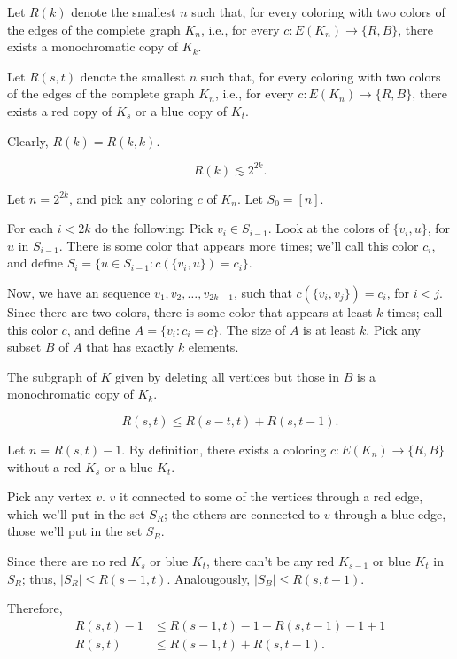 \begin{defn}
	Let $R(k)$ denote the smallest $n$ such that, for every coloring with two colors of the edges of the complete graph $K_n$, i.e., for every $c: E(K_n) \to \{R, B\}$, there exists a monochromatic copy of $K_k$.

	Let $R(s, t)$ denote the smallest $n$ such that, for every coloring with two colors of the edges of the complete graph $K_n$, i.e., for every $c: E(K_n) \to \{R, B\}$, there exists a red copy of $K_s$ or a blue copy of $K_t$.

	Clearly, $R(k) = R(k, k)$.
\end{defn}

\begin{thm}
	\[
		R(k) \lesssim 2^{2k}.
	\]
\end{thm}

\begin{sk}	
	Let $n = 2^{2k}$, and pick any coloring $c$ of $K_{n}$.
	Let $S_0 = [n]$.

	For each $i < 2k$ do the following:
	Pick $v_i \in S_{i-1}$. Look at the colors of $\{v_i, u\}$, for $u$ in $S_{i-1}$. There is some color that appears more times; we'll call this color $c_i$, and define $S_i = \{u \in S_{i-1} \colon c(\{v_i, u\}) = c_i\}$.


	Now, we have an sequence $v_1, v_2, \dots, v_{2k-1}$, such that $c(\{v_i, v_j\}) = c_i$, for $i < j$. Since there are two colors, there is some color that appears at least $k$ times; call this color $c$, and define $A = \{v_i \colon c_i = c\}$. The size of $A$ is at least $k$. Pick any subset $B$ of $A$ that has exactly $k$ elements.

	The subgraph of $K$ given by deleting all vertices but those in $B$ is a monochromatic copy of $K_k$.
\end{sk}

\begin{lem}\label{lem:upperrecurenceramsey}
	\[
		R(s, t) \le R(s-t, t) + R(s, t-1).
	\]
\end{lem}
\begin{dem}
	Let $n = R(s, t) - 1$. By definition, there exists a coloring $c \colon E(K_n) \to \{R, B\}$ without a red $K_s$ or a blue $K_t$.

	Pick any vertex $v$. $v$ it connected to some of the vertices through a red edge, which we'll put in the set $S_R$; the others are connected to $v$ through a blue edge, those we'll put in the set $S_B$.

	Since there are no red $K_s$ or blue $K_t$, there can't be any red $K_{s-1}$ or blue  $K_t$ in $S_R$; thus, $|S_R| \le R(s - 1, t)$. Analougously, $|S_B| \le R(s, t-1)$.

	Therefore,
	\begin{align*}
		R(s, t) - 1 &\le R(s - 1, t) - 1 + R(s, t-1) - 1 + 1\\
		R(s, t) &\le R(s - 1, t) + R(s, t-1).
	\end{align*}
\end{dem}	

